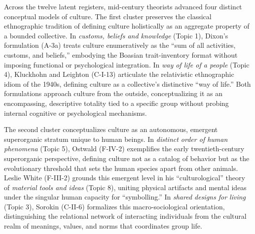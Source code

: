 \documentclass[11pt]{article}
\begin{document}
Across the twelve latent registers, mid-century theorists advanced four distinct conceptual models of culture. The first cluster preserves the classical ethnographic tradition of defining culture holistically as an aggregate property of a bounded collective. In \emph{customs, beliefs and knowledge} (Topic 1), Dixon's formulation (A-3a) treats culture enumeratively as the ``sum of all activities, customs, and beliefs,'' embodying the Boasian trait-inventory format without imposing functional or psychological integration. In \emph{way of life of a people} (Topic 4), Kluckhohn and Leighton (C-I-13) articulate the relativistic ethnographic idiom of the 1940s, defining culture as a collective's distinctive ``way of life.'' Both formulations approach culture from the outside, conceptualizing it as an encompassing, descriptive totality tied to a specific group without probing internal cognitive or psychological mechanisms.

The second cluster conceptualizes culture as an autonomous, emergent superorganic stratum unique to human beings. In \emph{distinct order of human phenomena} (Topic 5), Ostwald (F-IV-2) exemplifies the early twentieth-century superorganic perspective, defining culture not as a catalog of behavior but as the evolutionary threshold that sets the human species apart from other animals. Leslie White (F-III-2) grounds this emergent level in his ``culturological'' theory of \emph{material tools and ideas} (Topic 8), uniting physical artifacts and mental ideas under the singular human capacity for ``symbolling.'' In \emph{shared designs for living} (Topic 3), Sorokin (C-II-6) formalizes this macro-sociological orientation, distinguishing the relational network of interacting individuals from the cultural realm of meanings, values, and norms that coordinates group life.
\end{document}
